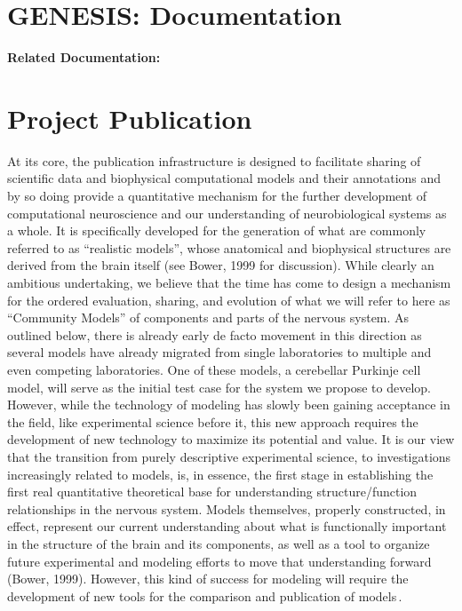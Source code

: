 \documentclass[12pt]{article}
\begin{document}
\section*{GENESIS: Documentation}

{\bf Related Documentation:}

\section*{Project Publication}

At its core, the publication infrastructure is designed to facilitate sharing of scientific data and biophysical computational models and their annotations and by so doing provide a quantitative mechanism for the further development of computational neuroscience and our understanding of neurobiological systems as a whole.  It is specifically developed for the generation of what are commonly referred to as ``realistic models'', whose anatomical and biophysical structures are derived from the brain itself (see Bower, 1999 for discussion).  While clearly an ambitious undertaking, we believe that the time has come to design a mechanism for the ordered evaluation, sharing, and evolution of what we will refer to here as ``Community Models'' of components and parts of the nervous system. As outlined below, there is already early de facto movement in this direction as several models have already migrated from single laboratories to multiple and even competing laboratories.   One of these models, a cerebellar Purkinje cell model, will serve as the initial test case for the system we propose to develop.  However, while the technology of modeling has slowly been gaining acceptance in the field, like experimental science before it, this new approach requires the development of new technology to maximize its potential and value.  It is our view that the transition from purely descriptive experimental science, to investigations increasingly related to models, is, in essence, the first stage in establishing the first real quantitative theoretical base for understanding structure/function relationships in the nervous system.  Models themselves, properly constructed, in effect, represent our current understanding about what is functionally important in the structure of the brain and its components, as well as a tool to organize future experimental and modeling efforts to move that understanding forward (Bower, 1999).  However, this kind of success for modeling will require the development of new tools for the comparison and publication of models\,\cite{Nickerson:2009uq, Wolkenhauer:2009kx}.
\end{document}
